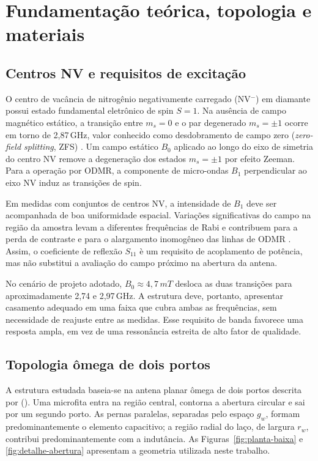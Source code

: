 \documentclass[10pt,a4paper,twocolumn]{article}
\newcommand{\citeonline}[1]{\citeauthor{#1} (\citeyear{#1})}
\begin{document}
\section{Fundamenta\c{c}\~ao te\'orica, topologia e materiais}
\label{sec:fundamentacao}

\subsection{Centros NV e requisitos de excita\c{c}\~ao}

O centro de vac\^ancia de nitrog\^enio negativamente carregado
(NV$^-$) em diamante possui estado fundamental eletr\^onico de spin
$S=1$. Na aus\^encia de campo magn\'etico est\'atico, a transi\c{c}\~ao
entre $m_s=0$ e o par degenerado $m_s=\pm1$ ocorre em torno de
2,87\,GHz, valor conhecido como desdobramento de campo zero
(\emph{zero-field splitting}, ZFS) \cite{doherty2013,abesasaki2018}.
Um campo est\'atico $B_0$ aplicado ao longo do eixo de simetria do
centro NV remove a degenera\c{c}\~ao dos estados $m_s=\pm1$ por efeito
Zeeman. Para a opera\c{c}\~ao por ODMR, a componente de micro-ondas
$B_1$ perpendicular ao eixo NV induz as transi\c{c}\~oes de spin.

Em medidas com conjuntos de centros NV, a intensidade de $B_1$ deve
ser acompanhada de boa uniformidade espacial. Varia\c{c}\~oes
significativas do campo na regi\~ao da amostra levam a diferentes
frequ\^encias de Rabi e contribuem para a perda de contraste e para o
alargamento inomog\^eneo das linhas de ODMR \cite{barry2020,opaluch2021}.
Assim, o coeficiente de reflex\~ao $S_{11}$ \`e um requisito de
acoplamento de pot\^encia, mas n\~ao substitui a avalia\c{c}\~ao do
campo pr\'oximo na abertura da antena.

No cen\'ario de projeto adotado, $B_0\approx4,7\,mT$ desloca as duas
transi\c{c}\~oes para aproximadamente 2,74 e 2,97\,GHz. A estrutura
deve, portanto, apresentar casamento adequado em uma faixa que cubra
ambas as frequ\^encias, sem necessidade de reajuste entre as medidas.
Esse requisito de banda favorece uma resposta ampla, em vez de uma
resson\^ancia estreita de alto fator de qualidade.

\subsection{Topologia \^omega de dois portos}

A estrutura estudada baseia-se na antena planar \^omega de dois portos
descrita por \citeonline{opaluch2021}. Uma microfita entra na regi\~ao
central, contorna a abertura circular e sai por um segundo porto. As
pernas paralelas, separadas pelo espa\c{c}o $g_w$, formam
predominantemente o elemento capacitivo; a regi\~ao radial do la\c{c}o,
de largura $r_w$, contribui predominantemente com a indut\^ancia. As
Figuras~\ref{fig:planta-baixa} e \ref{fig:detalhe-abertura} apresentam
a geometria utilizada neste trabalho.
\end{document}
